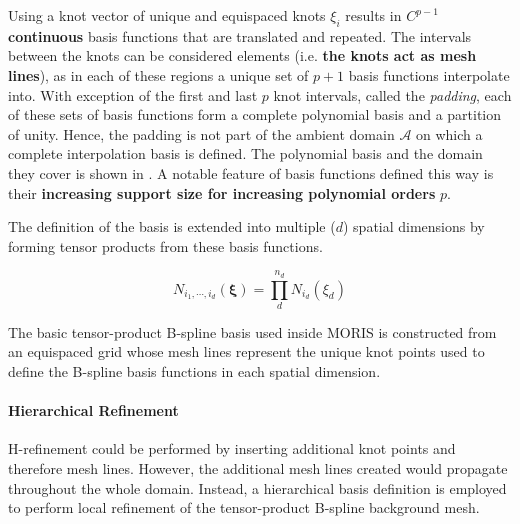 Using a knot vector of unique and equispaced knots $\xi_i$ results in \textbf{$C^{p-1}$ continuous} basis functions that are translated and repeated. The intervals between the knots can be considered elements (i.e. \textbf{the knots act as mesh lines}), as in each of these regions a unique set of $p+1$ basis functions interpolate into. With exception of the first and last $p$ knot intervals, called the \emph{padding}, each of these sets of basis functions form a complete polynomial basis and a partition of unity. Hence, the padding is not part of the ambient domain $\mathcal{A}$ on which a complete interpolation basis is defined. The polynomial basis and the domain they cover is shown in . A notable feature of basis functions defined this way is their \textbf{increasing support size for increasing polynomial orders} $p$.

The definition of the basis is extended into multiple ($d$) spatial dimensions by forming tensor products from these basis functions.

\begin{equation}
\label{eqn:tensor_product}
    N_{i_1, \cdots, i_d}(\bm{\xi}) = \prod_{d}^{n_d}N_{i_d}(\xi_d)
\end{equation}

The basic tensor-product B-spline basis used inside MORIS is constructed from an equispaced grid whose mesh lines represent the unique knot points used to define the B-spline basis functions in each spatial dimension.

\paragraph{Hierarchical Refinement}
\hypertarget{hierarchical_refinement}{}

H-refinement could be performed by inserting additional knot points and therefore mesh lines. However, the additional mesh lines created would propagate throughout the whole domain.
Instead, a hierarchical basis definition is employed to perform local refinement of the tensor-product B-spline background mesh.

